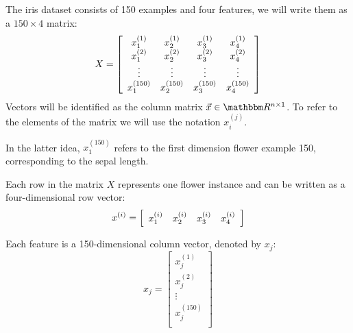 \documentclass[../machine_learning_scikit.tex]{subfiles}
\begin{document}
    \begin{idea}
        The iris dataset consists of 150 examples and four features, we will write them as a $150\times 4$ matrix:
        \begin{equation*}
            X=\left[
                \begin{array}{c c c c}
                    x_1^{(1)} & x_2^{(1)} & x_3^{(1)} & x_4^{(1)} \\
                    x_1^{(2)} & x_2^{(2)} & x_3^{(2)} & x_4^{(2)} \\
                    \vdots & \vdots & \vdots & \vdots \\
                    x_1^{(150)} & x_2^{(150)} & x_3^{(150)} & x_4^{(150)} \\
                \end{array}
            \right]
        \end{equation*}
        Vectors will be identified as the column matrix $\vec{x}\in\bbm{R}^{n\times1}$. To refer to the elements of the matrix we will use the notation $x_i^{(j)}$.
    \end{idea}

    \begin{obs}
        In the latter idea, $x_1^{(150)}$ refers to the first dimension flower example 150, corresponding to the sepal length.

        Each row in the matrix $X$ represents one flower instance and can be written as a four-dimensional row vector:
        \begin{equation*}
            x^{(i)}=\left[\begin{array}{c c c c}
                x_1^{(i)} & x_2^{(i)} & x_3^{(i)} & x_4^{(i)} \\
            \end{array} \right]
        \end{equation*}

        Each feature is a 150-dimensional column vector, denoted by $x_j$:
        \begin{equation*}
            x_j=\left[ 
                \begin{array}{c}
                    x_j^{(1)} \\
                    x_j^{(2)} \\
                    \vdots \\
                    x_j^{(150)} \\
                \end{array}
            \right]
        \end{equation*}
    \end{obs}
    
\end{document}
